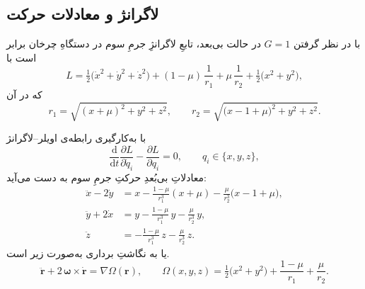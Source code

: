 \subsection{لاگرانژ و معادلات حرکت}
 با در نظر گرفتن
 $G=1$
 در حالت بی‌بعد،
  تابعِ لاگرانژِ جرمِ سوم در دستگاهِ چرخان برابر است با\cite{vallado2001fundamentals}
\begin{equation}\label{eq:L_crtbp}
	L=\tfrac12\bigl(\dot x^{2}+\dot y^{2}+\dot z^{2}\bigr)
	+(1-\mu)\,\frac{1}{r_{1}}+\mu\,\frac{1}{r_{2}}
	+\tfrac12\bigl(x^{2}+y^{2}\bigr),
\end{equation}
که در آن
\begin{equation}
	r_{1}=\sqrt{(x+\mu)^{2}+y^{2}+z^{2}},\qquad
	r_{2}=\sqrt{\bigl(x-1+\mu\bigr)^{2}+y^{2}+z^{2}}.
\end{equation}

با به‌کارگیری رابطه‌ی اویلر–لاگرانژ
\begin{equation*}
	\frac{\mathrm d}{\mathrm dt}\frac{\partial L}{\partial \dot q_{i}}-
	\frac{\partial L}{\partial q_{i}}=0,\qquad q_{i}\in\{x,y,z\},
\end{equation*}
معادلاتِ بی‌بُعدِ حرکتِ جرمِ سوم به دست می‌آید:
\begin{align}
	\ddot x-2\dot y &=
	x-\frac{1-\mu}{r_{1}^{3}}(x+\mu)-\frac{\mu}{r_{2}^{3}}\bigl(x-1+\mu\bigr),\\[2pt]
	\ddot y+2\dot x &=
	y-\frac{1-\mu}{r_{1}^{3}}\,y-\frac{\mu}{r_{2}^{3}}\,y,\\[2pt]
	\ddot z &= -\frac{1-\mu}{r_{1}^{3}}\,z-\frac{\mu}{r_{2}^{3}}\,z.
\end{align}
یا به نگاشتِ برداری به‌صورت زیر است.
\begin{equation}
	\ddot{\mathbf r}+2\,\boldsymbol\omega\times\dot{\mathbf r}=\nabla\Omega(\mathbf r),\qquad
	\Omega(x,y,z)=\tfrac12\bigl(x^{2}+y^{2}\bigr)+\frac{1-\mu}{r_{1}}+\frac{\mu}{r_{2}}.
\end{equation}
